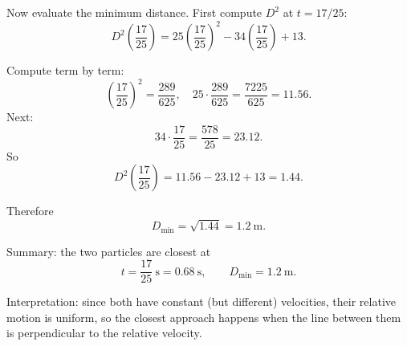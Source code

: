 \documentclass[12pt]{article}
\begin{document}
\begin{enumerate}
\begin{enumerate}
    Now evaluate the minimum distance. First compute $D^2$ at $t = 17/25$:
    \[
    D^2\!\left(\frac{17}{25}\right)
    = 25\left(\frac{17}{25}\right)^2 
    - 34\left(\frac{17}{25}\right)
    + 13.
    \]

    Compute term by term:
    \[
    \left(\frac{17}{25}\right)^2 = \frac{289}{625},
    \quad
    25 \cdot \frac{289}{625} = \frac{7225}{625} = 11.56.
    \]
    Next:
    \[
    34 \cdot \frac{17}{25} = \frac{578}{25} = 23.12.
    \]
    So
    \[
    D^2\!\left(\frac{17}{25}\right)
    = 11.56 - 23.12 + 13
    = 1.44.
    \]

    Therefore
    \[
    D_\text{min} = \sqrt{1.44} = 1.2~\text{m}.
    \]

    Summary: the two particles are closest at
    \[
    t = \frac{17}{25}~\text{s} = 0.68~\text{s},
    \qquad
    D_\text{min} = 1.2~\text{m}.
    \]

    Interpretation: since both have constant (but different) velocities, their relative motion is uniform, so the closest approach happens when the line between them is perpendicular to the relative velocity.
\end{enumerate}




\end{enumerate}
\end{document}
